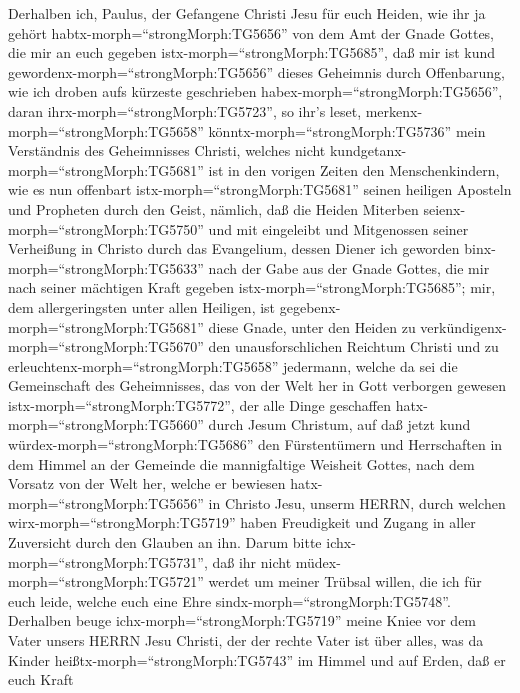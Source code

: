  Derhalben ich, Paulus, der Gefangene Christi Jesu für euch
Heiden,  wie ihr ja gehört
habtx-morph=``strongMorph:TG5656'' von dem Amt der Gnade Gottes, die mir
an euch gegeben istx-morph=``strongMorph:TG5685'',  daß mir
ist kund gewordenx-morph=``strongMorph:TG5656'' dieses Geheimnis durch
Offenbarung, wie ich droben aufs kürzeste geschrieben
habex-morph=``strongMorph:TG5656'',  daran
ihrx-morph=``strongMorph:TG5723'', so ihr's leset,
merkenx-morph=``strongMorph:TG5658'' könntx-morph=``strongMorph:TG5736''
mein Verständnis des Geheimnisses Christi,  welches nicht
kundgetanx-morph=``strongMorph:TG5681'' ist in den vorigen Zeiten den
Menschenkindern, wie es nun offenbart istx-morph=``strongMorph:TG5681''
seinen heiligen Aposteln und Propheten durch den Geist, 
nämlich, daß die Heiden Miterben seienx-morph=``strongMorph:TG5750'' und
mit eingeleibt und Mitgenossen seiner Verheißung in Christo durch das
Evangelium,  dessen Diener ich geworden
binx-morph=``strongMorph:TG5633'' nach der Gabe aus der Gnade Gottes,
die mir nach seiner mächtigen Kraft gegeben
istx-morph=``strongMorph:TG5685'';  mir, dem allergeringsten
unter allen Heiligen, ist gegebenx-morph=``strongMorph:TG5681'' diese
Gnade, unter den Heiden zu verkündigenx-morph=``strongMorph:TG5670'' den
unausforschlichen Reichtum Christi  und zu
erleuchtenx-morph=``strongMorph:TG5658'' jedermann, welche da sei die
Gemeinschaft des Geheimnisses, das von der Welt her in Gott verborgen
gewesen istx-morph=``strongMorph:TG5772'', der alle Dinge geschaffen
hatx-morph=``strongMorph:TG5660'' durch Jesum Christum, 
auf daß jetzt kund würdex-morph=``strongMorph:TG5686'' den Fürstentümern
und Herrschaften in dem Himmel an der Gemeinde die mannigfaltige
Weisheit Gottes,  nach dem Vorsatz von der Welt her, welche
er bewiesen hatx-morph=``strongMorph:TG5656'' in Christo Jesu, unserm
HERRN,  durch welchen wirx-morph=``strongMorph:TG5719''
haben Freudigkeit und Zugang in aller Zuversicht durch den Glauben an
ihn.  Darum bitte ichx-morph=``strongMorph:TG5731'', daß
ihr nicht müdex-morph=``strongMorph:TG5721'' werdet um meiner Trübsal
willen, die ich für euch leide, welche euch eine Ehre
sindx-morph=``strongMorph:TG5748''.  Derhalben beuge
ichx-morph=``strongMorph:TG5719'' meine Kniee vor dem Vater unsers HERRN
Jesu Christi,  der der rechte Vater ist über alles, was da
Kinder heißtx-morph=``strongMorph:TG5743'' im Himmel und auf Erden,
 daß er euch Kraft
